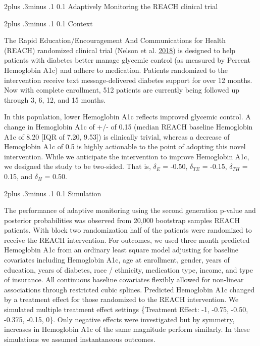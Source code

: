 \documentclass[12pt,oneside]{book}
\makeatletter
\newlength{\li}\setlength{\li}{14.48pt}
\newlength{\di}\setlength{\di}{-3.5mm}
\renewcommand\section{ \@startsection {section}{1}{\z@}%
    {2\@bls  plus .3\@bls minus .1\@bls}%
    {0.1\@bls}%
    {\centering\normalfont}}
\renewcommand\subsection{\@startsection {subsection}{2}{\z@}%
    {2\@bls  plus .3\@bls minus .1\@bls}%
    {0.1\@bls}%
    {\noindent\normalfont}}
\theoremstyle{definition}
\theoremstyle{definition}
\theoremstyle{definition}
\theoremstyle{remark}
\makeatother
\begin{document}
\hypertarget{adaptively-monitoring-the-reach-clinical-trial}{%
\section{Adaptively Monitoring the REACH clinical
trial}\label{adaptively-monitoring-the-reach-clinical-trial}}

\hypertarget{context}{%
\subsection{Context}\label{context}}

The Rapid Education/Encouragement And Communications for Health (REACH)
randomized clinical trial (Nelson et al.
\protect\hyperlink{ref-Nelson:2018bw}{2018}) is designed to help
patients with diabetes better manage glycemic control (as measured by
Percent Hemoglobin A1c) and adhere to medication. Patients randomized to
the intervention receive text message-delivered diabetes support for
over 12 months. Now with complete enrollment, 512 patients are currently
being followed up through 3, 6, 12, and 15 months.

In this population, lower Hemoglobin A1c reflects improved glycemic
control. A change in Hemoglobin A1c of +/- of 0.15 (median REACH
baseline Hemoglobin A1c of 8.20 {[}IQR of 7.20, 9.53{]}) is clinically
trivial, whereas a decrease of Hemoglobin A1c of 0.5 is highly
actionable to the point of adopting this novel intervention. While we
anticipate the intervention to improve Hemoglobin A1c, we designed the
study to be two-sided. That is, \(\delta_E\) = -0.50, \(\delta_{TE}\) =
-0.15, \(\delta_{TH}\) = 0.15, and \(\delta_H\) = 0.50.

\hypertarget{simulation}{%
\subsection{Simulation}\label{simulation}}

The performance of adaptive monitoring using the second generation
p-value and posterior probabilities was observed from 20,000 bootstrap
samples REACH patients. With block two randomization half of the
patients were randomized to receive the REACH intervention. For
outcomes, we used three month predicted Hemoglobin A1c from an ordinary
least square model adjusting for baseline covariates including
Hemoglobin A1c, age at enrollment, gender, years of education, years of
diabetes, race / ethnicity, medication type, income, and type of
insurance. All continuous baseline covariates flexibly allowed for
non-linear associations through restricted cubic splines. Predicted
Hemoglobin A1c changed by a treatment effect for those randomized to the
REACH intervention. We simulated multiple treatment effect settings
\{Treatment Effect: -1, -0.75, -0.50, -0.375, -0.15, 0\}. Only negative
effects were investigated but by symmetry, increases in Hemoglobin A1c
of the same magnitude perform similarly. In these simulations we assumed
instantaneous outcomes.
\end{document}
